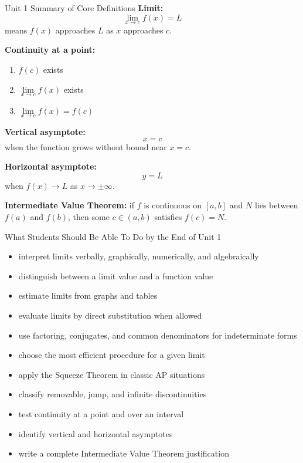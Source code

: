 \documentclass[11pt]{article}
\begin{document}
\begin{theorybox}{Unit 1 Summary of Core Definitions}
\textbf{Limit:}
\[
\lim_{x\to c}f(x)=L
\]
means $f(x)$ approaches $L$ as $x$ approaches $c$.

\textbf{Continuity at a point:}
\begin{enumerate}
    \item $f(c)$ exists
    \item $\lim\limits_{x\to c}f(x)$ exists
    \item $\lim\limits_{x\to c}f(x)=f(c)$
\end{enumerate}

\textbf{Vertical asymptote:}
\[
x=c
\]
when the function grows without bound near $x=c$.

\textbf{Horizontal asymptote:}
\[
y=L
\]
when $f(x)\to L$ as $x\to \pm\infty$.

\textbf{Intermediate Value Theorem:} if $f$ is continuous on $[a,b]$ and $N$ lies between $f(a)$ and $f(b)$, then some $c\in(a,b)$ satisfies $f(c)=N$.
\end{theorybox}

\begin{skillbox}{What Students Should Be Able To Do by the End of Unit 1}
\begin{itemize}
    \item interpret limits verbally, graphically, numerically, and algebraically
    \item distinguish between a limit value and a function value
    \item estimate limits from graphs and tables
    \item evaluate limits by direct substitution when allowed
    \item use factoring, conjugates, and common denominators for indeterminate forms
    \item choose the most efficient procedure for a given limit
    \item apply the Squeeze Theorem in classic AP situations
    \item classify removable, jump, and infinite discontinuities
    \item test continuity at a point and over an interval
    \item identify vertical and horizontal asymptotes
    \item write a complete Intermediate Value Theorem justification
\end{itemize}
\end{skillbox}
\end{document}
